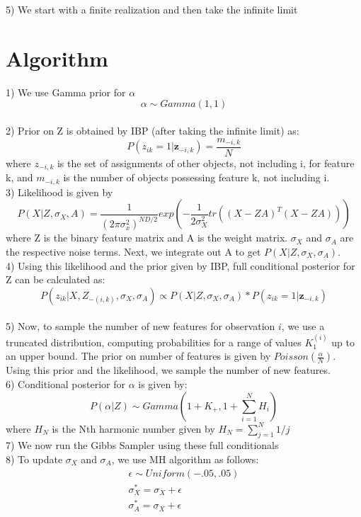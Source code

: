 \documentclass[11pt]{article}
\begin{document}
5) We start with a finite realization and then take the infinite limit\\

\section{Algorithm}
1) We use Gamma prior for $\alpha$
$$
\alpha \sim Gamma(1,1)
$$\\

2) Prior on Z is obtained by IBP (after taking the infinite limit) as:
$$
P(z_{ik}=1|\textbf{z}_{-i,k}) = \frac{m_{-i,k}}{N}
$$
where ${z}_{-i,k}$ is the set of assignments of other objects, not including i, for feature k, and
${m}_{-i,k}$ is the number of objects possessing feature k, not including i.\\

3) Likelihood is given by
\begin{equation}
P(X|Z,\sigma_X,A) = \frac{1}{(2 \pi \sigma_x^2)^{ND/2}}exp(-\frac{1}{2\sigma_X^2}tr((X-ZA)^T(X-ZA)))
\end{equation}
where Z is the binary feature matrix and A is the weight matrix. $\sigma_X$ and $\sigma_A$ are the respective noise terms.
Next, we integrate out A to get $P(X|Z,\sigma_X,\sigma_A)$.\\

4) Using this likelihood and the prior given by IBP, full conditional posterior for Z can be calculated as:
$$
P(z_{ik}|X,Z_{-(i,k)},\sigma_X,\sigma_A) \propto  P(X|Z,\sigma_X,\sigma_A) * P(z_{ik}=1|\textbf{z}_{-i,k})
$$\\

5) Now, to sample the number of new features for observation $i$, we use a truncated distribution, computing probabilities for a range of values $K_1^{(i)}$ up to an upper bound. The prior on number of features is given by $Poisson(\frac{\alpha}{N})$.
Using this prior and the likelihood, we sample the number of new features.\\

6) Conditional posterior for $\alpha$ is given by:
$$
P(\alpha|Z) \sim Gamma(1+K_+,1+\sum_{i=1}^{N} H_i)
$$
where $H_N$ is the Nth harmonic number given by $H_N=\sum_{j=1}^{N} 1/j$\\

7) We now run the Gibbs Sampler using these full conditionals\\

8) To update $\sigma_X$ and $\sigma_A$, we use MH algorithm as follows:
\begin{eqnarray}
\epsilon \sim Uniform(-.05,.05)\\
\sigma_X^{*} =  \sigma_X +\epsilon\\
\sigma_A^{*} =  \sigma_X +\epsilon\\
\end{eqnarray}
\end{document}
